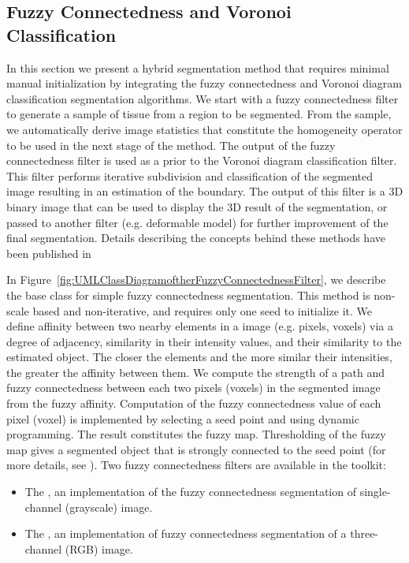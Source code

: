 \ifitkFullVersion

\fi



\subsection{Fuzzy Connectedness and Voronoi Classification}
\label{sec:HybridMethod1}
In this section we present a hybrid segmentation method that requires
minimal manual initialization by integrating the fuzzy connectedness and
Voronoi diagram classification segmentation algorithms. We start with a fuzzy
connectedness filter to generate a sample of tissue from a region to be
segmented. From the sample, we automatically derive image statistics that
constitute the homogeneity operator to be used in the next stage of the
method. The output of the fuzzy connectedness filter is used as a prior to
the Voronoi diagram classification filter. This filter performs iterative
subdivision and classification of the segmented image resulting in an
estimation of the boundary. The output of this filter is a 3D binary image
that can be used to display the 3D result of the segmentation, or passed to
another filter (e.g. deformable model) for further improvement of the final
segmentation. Details describing the concepts behind these methods have been
published in
\cite{Angelini2002,Udupa2002,Jin2002,Imielinska2001,Imielinska2000a,Imielinska2000b}

In Figure~\ref{fig:UMLClassDiagramoftherFuzzyConnectednessFilter}, we
describe the base class for simple fuzzy connectedness segmentation. This
method is non-scale based and non-iterative, and requires only one seed to
initialize it. We define affinity between two nearby elements in a image
(e.g. pixels, voxels) via a degree of adjacency, similarity in their
intensity values, and their similarity to the estimated object.  The closer
the elements and the more similar their intensities, the greater the affinity
between them. We compute the strength of a path and fuzzy connectedness
between each two pixels (voxels) in the segmented image from the fuzzy
affinity.  Computation of the fuzzy connectedness value of each pixel (voxel)
is implemented by selecting a seed point and using dynamic programming. The
result constitutes the fuzzy map. Thresholding of the fuzzy map gives a
segmented object that is strongly connected to the seed point (for more
details, see \cite{Udupa1996}). Two fuzzy connectedness filters are available
in the toolkit:

\begin{itemize}
\item The , an implementation of the
fuzzy connectedness segmentation of single-channel (grayscale) image.
\item The , an implementation
of fuzzy connectedness segmentation of a three-channel (RGB) image.
\end{itemize}

